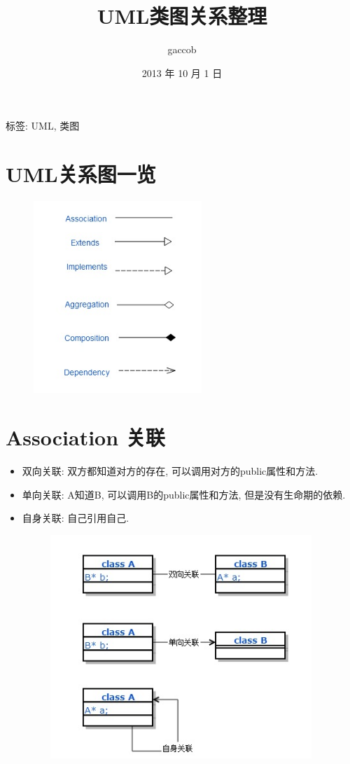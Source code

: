 

\title {\ZHH \huge UML类图关系整理}
\author {\small gaccob}
\date {\small 2013 年 10 月 1 日}
\maketitle
\begin {center}
{\ZHH \small 标签: UML, 类图}
\end {center}

\vspace {10pt}
\section {\ZHH UML关系图一览} {
    \begin {figure} [htbp]
        \centering
        \includegraphics [width=180pt, keepaspectratio] {relation.png}
    \end {figure}
}

\section {\ZHH Association 关联} {
    \begin {itemize}
    \item {双向关联: 双方都知道对方的存在, 可以调用对方的public属性和方法.}
    \item {单向关联: A知道B, 可以调用B的public属性和方法, 但是没有生命期的依赖. }
    \item {自身关联: 自己引用自己. }
    \begin {figure} [htbp]
        \centering
        \includegraphics [width=280pt, keepaspectratio] {association.png}
    \end {figure}
    \end {itemize}
}

